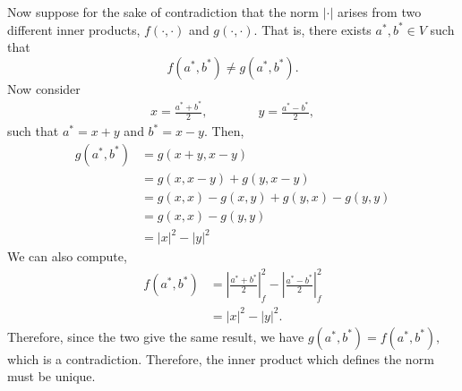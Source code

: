 \documentclass{article}
\numberwithin{equation}{section}
\begin{document}
\begin{enumerate}
\begin{enumerate}
        Now suppose for the sake of contradiction that the norm $|\cdot |$ arises from two different inner products, $f(\cdot,\cdot)$ and $g(\cdot,\cdot).$ That is, there exists $a^*,b^*\in V$ such that 
        \begin{equation*}
            f(a^*,b^*) \neq g(a^*,b^*).
        \end{equation*}  
        Now consider 
        \begin{align}
            x = \frac{a^*+b^*}{2},\quad\quad\quad\quad y = \frac{a^*-b^*}{2},
        \end{align}
        such that $a^*=x+y$ and $b^*=x-y.$ Then, 
        \begin{align}
            g(a^*,b^*) &= g(x+y,x-y) \\ 
            &= g(x,x-y)+g(y,x-y) \\ 
            &= g(x,x) - g(x,y) + g(y,x) - g(y,y) \\ 
            &= g(x,x) - g(y,y) \\ 
            &= |x|^2 - |y|^2
        \end{align}
        We can also compute,
        \begin{align}
            f(a^*,b^*) &= \left|\frac{a^*+b^*}{2}\right|_f^2- \left|\frac{a^*-b^*}{2}\right|_f^2 \\ 
            &= |x|^2 - |y|^2.
        \end{align}
        Therefore, since the two give the same result, we have $g(a^*,b^*)= f(a^*,b^*),$ which is a contradiction. Therefore, the inner product which defines the norm must be unique.


\end{enumerate}
\end{enumerate}
\end{document}

